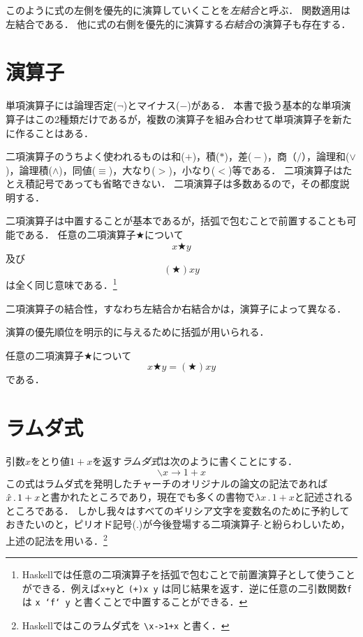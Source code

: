 \documentclass[twocolumn]{jsbook}
\newcommand{\keyword}[1]{\emph{#1}}
\newcommand{\code}[1]{\texttt{#1}}
\newenvironment{point}{\begin{screen}}{\end{screen}}
\newcommand{\lambdasym}{\backslash}
\newcommand{\lambdadot}{\rightarrow}
\newcommand{\lambdaexp}[2]{\lambdasym#1\lambdadot#2}
\newcommand{\binaryeq}{\equiv}
\newcommand{\binaryl}{<}
\newcommand{\binaryg}{>}
\newcommand{\binaryadd}{+}
\newcommand{\binarysub}{-}
\newcommand{\binarymultiply}{*}
\newcommand{\binarydivide}{/}
\newcommand{\binaryor}{\vee}
\newcommand{\binaryand}{\wedge}
\newcommand{\mathbinaryop}{\bigstar}
\begin{document}
このように式の左側を優先的に演算していくことを\keyword{左結合}と呼ぶ．
関数適用は左結合である．
他に式の右側を優先的に演算する\keyword{右結合}の演算子も存在する．

\section{演算子}

単項演算子には論理否定($\neg$)とマイナス($-$)がある．
本書で扱う基本的な単項演算子はこの2種類だけであるが，複数の演算子を組み合わせて単項演算子を新たに作ることはある．

二項演算子のうちよく使われるものは和($\binaryadd$)，積($\binarymultiply$)，差(${}\binarysub{}$)，商（${}\binarydivide{}$），論理和($\binaryor$)，論理積($\binaryand$)，同値($\binaryeq$)，大なり($\binaryg$)，小なり($\binaryl$)等である．
二項演算子はたとえ積記号であっても省略できない．
二項演算子は多数あるので，その都度説明する．

二項演算子は中置することが基本であるが，括弧で包むことで前置することも可能である．
任意の二項演算子$\mathbinaryop$について$$x\mathbinaryop y$$及び$$(\mathbinaryop)xy$$は全く同じ意味である．\footnote{Haskellでは任意の二項演算子を括弧で包むことで前置演算子として使うことができる．例えば\code{x+y}と \code{(+)x y} は同じ結果を返す．逆に任意の二引数関数\code{f}は \code{x `f` y} と書くことで中置することができる．}

二項演算子の結合性，すなわち左結合か右結合かは，演算子によって異なる．

演算の優先順位を明示的に与えるために括弧が用いられる．

\begin{point}
任意の二項演算子$\mathbinaryop$について$$x\mathbinaryop y=(\mathbinaryop)xy$$である．
\end{point}

\section{ラムダ式}
引数$x$をとり値$1+x$を返す\keyword{ラムダ式}は次のように書くことにする．
$$\lambdaexp{x}{1+x}$$
この式はラムダ式を発明したチャーチのオリジナルの論文の記法であれば$\Hat x\,.\,1+x$と書かれたところであり，現在でも多くの書物で$\lambda x\,.\,1+x$と記述されるところである．
しかし我々はすべてのギリシア文字を変数名のために予約しておきたいのと，ピリオド記号($.$)が今後登場する二項演算子$\cdot$と紛らわしいため，上述の記法を用いる．\footnote{Haskellではこのラムダ式を \code{\textbackslash x->1+x} と書く．}
\end{document}
